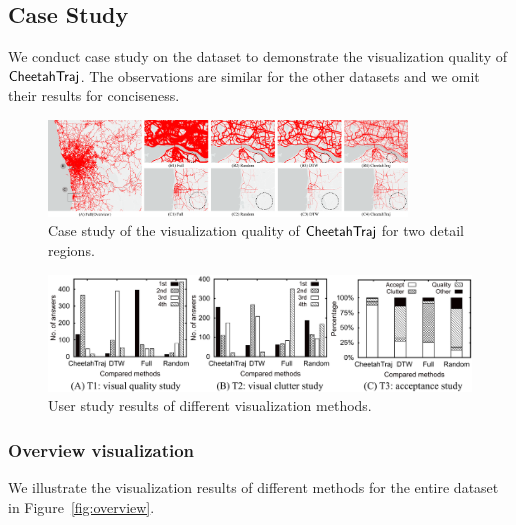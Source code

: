 \subsection{Case Study}\label{sec:case}

We conduct case study on the \pt{} dataset to demonstrate the visualization quality of $\mathsf{CheetahTraj}$. The observations are similar for the other datasets and we omit their results for conciseness.

\begin{figure}[t]
	\centering
	\includegraphics[width=0.85\textwidth]{pictures/case_study_icde/case_study_detail.pdf}
	\trim
	\vspace{-2mm}
	\caption{Case study of the visualization quality of $\mathsf{CheetahTraj}$ for two detail regions.}
	\label{fig:detailview}
	\trim \trim
\end{figure}



\begin{figure}
    \vspace{2mm}
	\centering
	\small
	\includegraphics[width=1.3\columnwidth]{pictures/user_study/user_study.pdf}  
	\trim \trim
	\caption{User study results of different visualization methods.} 
	\label{fig:userstudy}
	\trim \trim
\end{figure}



\subsubsection{Overview visualization}

We illustrate the visualization results of different methods for the entire \pt{} dataset in Figure~\ref{fig:overview}.

